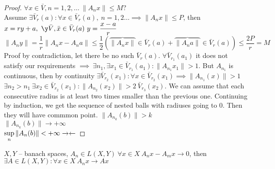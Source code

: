 \begin{proof}
  $\forall x \in \bar{V}, n = 1,2, \dots\ \|A_nx\| \leq M?$ \\
  Assume $\exists \bar{V}_r(a) : \forall x \in \bar{V}_r(a),\ n = 1,2 \dots \implies
  \|A_nx\| \leq P$, then \\
  $x = r y + a,\ \y \bar{V}, \bar{x} \in \bar{V}_r(a)\ y = \dfrac{x - a}{r}$ \\
  $\|A_ny\| = \dfrac 1r \|A_nx - A_na\| \leq \dfrac 12 (\overbrace{\|A_nx\|}{\in
    \bar{V}_r(a)} + \overbrace{\|A_na\|}{\in \bar{V}_r(a)}) \leq \dfrac{2P}{r} = M$
  Proof by contradiction, let there be no such $\bar{V}_r(a)$.
  $\forall \bar{V}_{r_1}(a_1)$ it does not satisfy our requirements $\implies\
  \exists n_1, \exists x_1 \in \bar{V}_{r_1}(a_1): \|A_{n_1}x_1\| > 1$. But
  $A_{n_1}$ is continuous, then by continuity $\exists \bar{V}_{r_2}(x_1): \forall
  x \in \bar{V}_{r_2}(x_1) \implies \|A_{n_1}(x)\| > 1$ \\
  $\exists n_2 > n_1\ \exists x_2 \in \bar{V}_{r_2}(x_1): \|A_{n_2}(x_2)\| > 2\
  \bar{V}_{r_3}(x_2)$.
  We can assume that each consecutive radius is at least two times smaller than
  the previous one. Continuing by induction, we get the sequence of nested balls
  with radiuses going to 0. Then they will have commmon point. 
  $\|A_{n_k}(b)\| > k$  \\
  $\|A_{n_k}(b)\| \to +\infty$ \\
  $\sup\limits_n \|A_n(b)\| < +\infty \rightarrow\leftarrow$
\end{proof}

\begin{cor}
  $X, Y$ -- banach spaces, $A_n \in L(X, Y)\ \forall x \in X\ A_n x - A_mx \to
  0$, then $\exists A \in L(X, Y): \forall x \in X\ A_nx \to Ax$
\end{cor}